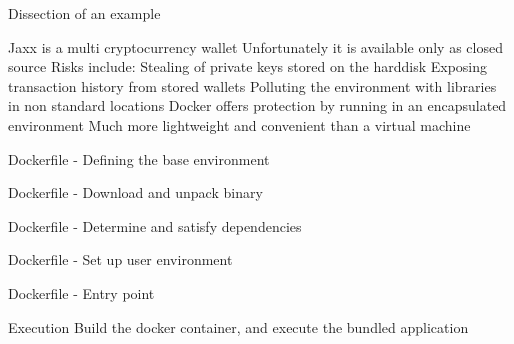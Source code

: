 \documentclass[11pt, aspectratio=169]{beamer}
\begin{document}
\begin{frame}{Dissection of an example}
\begin{outline}
\1 Jaxx is a multi cryptocurrency wallet
\1 Unfortunately it is available only as closed source
\1 Risks include:
  \2 Stealing of private keys stored on the harddisk
  \2 Exposing transaction history from stored wallets
  \2 Polluting the environment with libraries in non standard locations
\1 Docker offers protection by running in an encapsulated environment
\1 Much more lightweight and convenient than a virtual machine
\end{outline}
\end{frame}

\begin{frame}{Dockerfile - Defining the base environment} 

\end{frame}

\begin{frame}{Dockerfile - Download and unpack binary} 

\end{frame}

\begin{frame}{Dockerfile - Determine and satisfy dependencies} 

\end{frame}

\begin{frame}{Dockerfile - Set up user environment} 

\end{frame}

\begin{frame}{Dockerfile - Entry point} 

\end{frame}

\begin{frame}{Execution} 
Build the docker container, and execute the bundled application

\end{frame}
\end{document}
